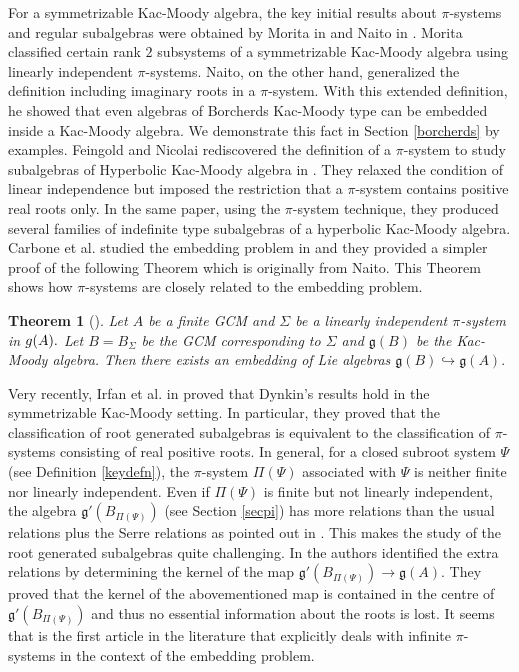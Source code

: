 \documentclass[12pt,reqno]{amsart}
\theoremstyle{plain}
\newtheorem*{thm}{Theorem}
\theoremstyle{definition}
\theoremstyle{remark}
\newcommand{\lie}[1]{\mathfrak{#1}}
\begin{document}
 For a symmetrizable Kac-Moody algebra, the key initial results about $\pi$-systems and regular subalgebras were obtained by Morita in \cite{morita1989certain} and Naito in \cite{naito1992regular}. Morita classified certain rank $2$ subsystems of a symmetrizable Kac-Moody algebra using linearly independent $\pi$-systems. Naito, on the other hand, generalized the definition including imaginary roots in a $\pi$-system. With this extended definition, he showed that even algebras of Borcherds Kac-Moody type can be embedded inside a Kac-Moody algebra. We demonstrate this fact in Section \ref{borcherds} by examples. Feingold and Nicolai rediscovered the definition of a $\pi$-system to study subalgebras of Hyperbolic Kac-Moody algebra in \cite{feingold2004subalgebras}. They relaxed the condition of linear independence but imposed the restriction that a $\pi$-system contains positive real roots only. In the same paper, using the $\pi$-system technique, they produced several families of indefinite type subalgebras of a hyperbolic Kac-Moody algebra. Carbone et al. studied the embedding problem in \cite{carbone2021varvec} and they provided a simpler proof of the following Theorem which is originally from Naito. This Theorem shows how $\pi$-systems are closely related to the embedding problem.
 \begin{thm}[\cite{carbone2021varvec,naito1992regular}]
     Let $A$ be a finite GCM and $\Sigma$ be a linearly independent $\pi$-system in $\lie \lie g(A).$ Let $B=B_\Sigma$ be the GCM corresponding to $\Sigma$ and  $\lie g(B)$ be the Kac-Moody algebra. Then there exists an embedding of Lie algebras $\lie g(B) \hookrightarrow \lie g(A).$
 \end{thm}
 Very recently, Irfan et al. in \cite{habib2023root} proved that Dynkin's results hold in the symmetrizable Kac-Moody setting. In particular, they proved that the classification of root generated subalgebras is equivalent to the classification of $\pi$-systems consisting of real positive roots. In general, for a closed subroot system $\Psi$ (see Definition \ref{keydefn}), the $\pi$-system $\Pi(\Psi)$ associated with $\Psi$ is neither finite nor linearly independent. Even if $\Pi(\Psi)$ is finite but not linearly independent, the algebra $\lie g'(B_{\Pi(\Psi)})$ (see Section \ref{secpi}) has more relations than the usual relations plus the Serre relations as pointed out in \cite[Page 14, Comment 1]{Henn06Geometric}. This makes the study of the root generated subalgebras quite challenging. In \cite{habib2023root} the authors identified the extra relations by determining the kernel of the map $\lie g'(B_{\Pi(\Psi)})\to \lie g(A).$ They proved that the kernel of the abovementioned map is contained in the centre of $\lie g'(B_{\Pi(\Psi)})$ and thus no essential information about the roots is lost. It seems that \cite{habib2023root} is the first article in the literature that explicitly deals with infinite $\pi$-systems in the context of the embedding problem.
\end{document}
